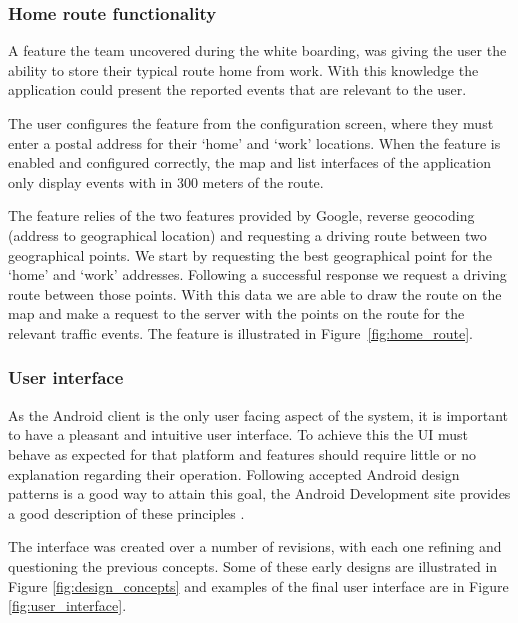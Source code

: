 \subsubsection{Home route functionality}
A feature the team uncovered during the white boarding, was giving the user the
ability to store their typical route home from work. With this knowledge the
application could present the reported events that are relevant to the user.

The user configures the feature from the configuration screen, where they must
enter a postal address for their ‘home’ and ‘work’ locations. When the feature
is enabled and configured correctly, the map and list interfaces of the
application only display events with in 300 meters of the route.

The feature relies of the two features provided by Google, reverse geocoding
(address to geographical location) and requesting a driving route between two
geographical points. We start by requesting the best geographical point for the
‘home’ and ‘work’ addresses. Following a successful response we request a
driving route between those points. With this data we are able to draw the
route on the map and make a request to the server with the points on the route
for the relevant traffic events. The feature is illustrated in Figure~\ref{fig:home_route}.

\subsubsection{User interface}
As the Android client is the only user facing aspect of the system, it is
important to have a pleasant and intuitive user interface. To achieve this the
UI must behave as expected for that platform and features should require little
or no explanation regarding their operation. Following accepted Android design
patterns is a good way to attain this goal, the Android Development site
provides a good description of these principles \cite{website:android_ui}.

The interface was created over a number of revisions, with each one refining
and questioning the previous concepts. Some of these early designs are illustrated in
Figure \ref{fig:design_concepts} and examples of the final  user interface are in Figure
\ref{fig:user_interface}.
